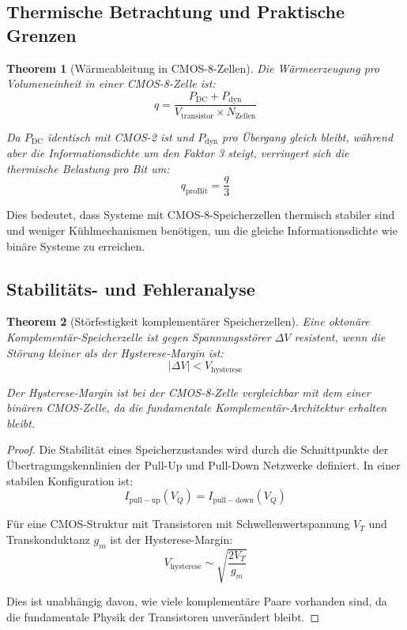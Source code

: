 \documentclass[12pt, a4paper]{article}
\newtheorem{theorem}{Theorem}[section]
\theoremstyle{definition}
\theoremstyle{remark}
\begin{document}
\subsection{Thermische Betrachtung und Praktische Grenzen}
\label{subsec:thermische_aspekte}

\begin{theorem}[Wärmeableitung in CMOS-8-Zellen]
\label{thm:waermeableitung}
Die Wärmeerzeugung pro Volumeneinheit in einer CMOS-8-Zelle ist:
\[
q = \frac{P_{\mathrm{DC}} + P_{\mathrm{dyn}}}{V_{\mathrm{transistor}} \times N_{\mathrm{Zellen}}}
\]

Da $P_{\mathrm{DC}}$ identisch mit CMOS-2 ist und $P_{\mathrm{dyn}}$ pro Übergang gleich bleibt, während aber die Informationsdichte um den Faktor 3 steigt, verringert sich die thermische Belastung pro Bit um:
\[
q_{\mathrm{pro Bit}} = \frac{q}{3}
\]
\end{theorem}

Dies bedeutet, dass Systeme mit CMOS-8-Speicherzellen thermisch stabiler sind und weniger Kühlmechanismen benötigen, um die gleiche Informationsdichte wie binäre Systeme zu erreichen.

\subsection{Stabilitäts- und Fehleranalyse}
\label{subsec:stabilitaetsanalyse_oktonaer}

\begin{theorem}[Störfestigkeit komplementärer Speicherzellen]
\label{thm:stoerfestigkeit}
Eine oktonäre Komplementär-Speicherzelle ist gegen \textit{Spannungsstörer} $\Delta V$ resistent, wenn die Störung kleiner als der Hysterese-Margin ist:
\[
|\Delta V| < V_{\mathrm{hysterese}}
\]

Der Hysterese-Margin ist bei der CMOS-8-Zelle vergleichbar mit dem einer binären CMOS-Zelle, da die fundamentale Komplementär-Architektur erhalten bleibt.
\end{theorem}

\begin{proof}
Die Stabilität eines Speicherzustandes wird durch die Schnittpunkte der Übertragungskennlinien der Pull-Up und Pull-Down Netzwerke definiert. In einer stabilen Konfiguration ist:
\[
I_{\mathrm{pull-up}}(V_Q) = I_{\mathrm{pull-down}}(V_Q)
\]

Für eine CMOS-Struktur mit Transistoren mit Schwellenwertspannung $V_T$ und Transkonduktanz $g_m$ ist der Hysterese-Margin:
\[
V_{\mathrm{hysterese}} \sim \sqrt{\frac{2 V_T}{g_m}}
\]

Dies ist unabhängig davon, wie viele komplementäre Paare vorhanden sind, da die fundamentale Physik der Transistoren unverändert bleibt.
\end{proof}
\end{document}

